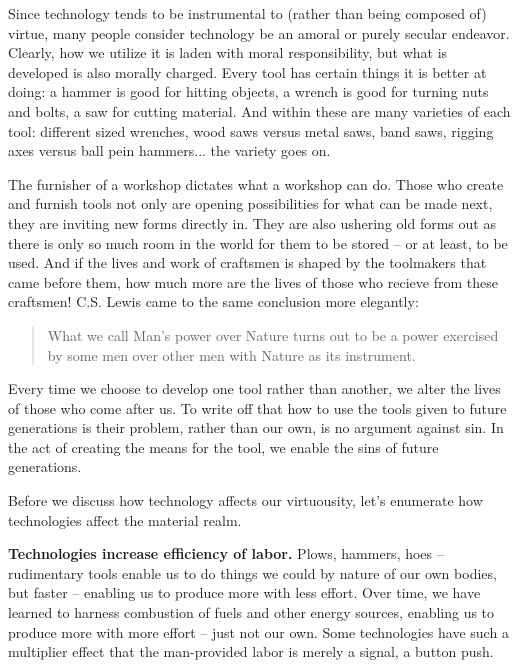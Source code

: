 \documentclass[letterpaper]{article}
\begin{document}
  Since technology tends to be instrumental to (rather than being composed of) virtue, many people consider technology be an amoral or purely secular endeavor. Clearly, how we utilize it is laden with moral responsibility, but what is developed is also morally charged. Every tool has certain things it is better at doing: a hammer is good for hitting objects, a wrench is good for turning nuts and bolts, a saw for cutting material. And within these are many varieties of each tool: different sized wrenches, wood saws versus metal saws, band saws, rigging axes versus ball pein hammers... the variety goes on.

  The furnisher of a workshop dictates what a workshop can do. Those who create and furnish tools not only are opening possibilities for what can be made next, they are inviting new forms directly in. They are also ushering old forms out as there is only so much room in the world for them to be stored -- or at least, to be used. And if the lives and work of craftsmen is shaped by the toolmakers that came before them, how much more are the lives of those who recieve from these craftsmen! C.S. Lewis came to the same conclusion more elegantly:

  \begin{quote}
    What we call Man's power over Nature turns out to be a power exercised by some men over other men with Nature as its instrument.
  \end{quote}

  Every time we choose to develop one tool rather than another, we alter the lives of those who come after us. To write off that how to use the tools given to future generations is their problem, rather than our own, is no argument against sin. In the act of creating the means for the tool, we enable the sins of future generations.

  Before we discuss how technology affects our virtuousity, let's enumerate how technologies affect the material realm.

  \textbf{Technologies increase efficiency of labor.} Plows, hammers, hoes -- rudimentary tools enable us to do things we could by nature of our own bodies, but faster -- enabling us to produce more with less effort. Over time, we have learned to harness combustion of fuels and other energy sources, enabling us to produce more with more effort -- just not our own. Some technologies have such a multiplier effect that the man-provided labor is merely a signal, a button push.
\end{document}
